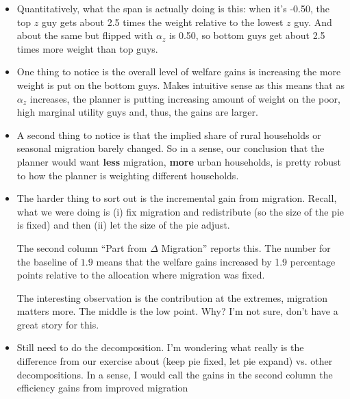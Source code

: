 \documentclass[12pt,pdftex]{article}
\begin{document}
\begin{onehalfspacing}
\begin{itemize}
\item Quantitatively, what the span is actually doing is this: when it's -0.50, the top $z$ guy gets about 2.5 times the weight relative to the lowest $z$ guy. And about the same but flipped with $\alpha_z$ is 0.50, so bottom guys get about 2.5 times more weight than top guys.

\item One thing to notice is the overall level of welfare gains is increasing the more weight is put on the bottom guys. Makes intuitive sense as this means that as $\alpha_z$ increases, the planner is putting increasing amount of weight on the poor, high marginal utility guys and, thus, the gains are larger.

\item A second thing to notice is that the implied share of rural households or seasonal migration barely changed. So in a sense, our conclusion that the planner would want \textbf{less} migration, \textbf{more} urban households, is pretty robust to how the planner is weighting different households.

\item The harder thing to sort out is the incremental gain from migration. Recall, what we were doing is (i) fix migration and redistribute (so the size of the pie is fixed) and then (ii) let the size of the pie adjust.

    The second column ``Part from $\Delta$ Migration'' reports this. The number for the baseline of $1.9$ means that the welfare gains increased by 1.9 percentage points relative to the allocation where migration was fixed.

    The interesting observation is the contribution at the extremes, migration matters more. The middle is the low point. Why? I'm not sure, don't have a great story for this.

\item Still need to do the decomposition. I'm wondering what really is the difference from our exercise about (keep pie fixed, let pie expand) vs. other decompositions. In a sense, I would call the gains in the second column the efficiency gains from improved migration
\end{itemize}
\newpage






\end{onehalfspacing}
\end{document}
